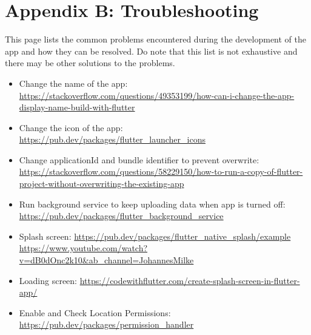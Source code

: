 \documentclass[a4paper]{scrreprt}
\begin{document}
\chapter{Appendix B: Troubleshooting}
This page lists the common problems encountered during the development of the app and how they can be resolved. Do note that this list is not exhaustive and there may be other solutions to the problems.
\begin{itemize}
    \item Change the name of the app:
    \url{https://stackoverflow.com/questions/49353199/how-can-i-change-the-app-display-name-build-with-flutter}
    
    \item Change the icon of the app:
    \url{https://pub.dev/packages/flutter_launcher_icons}
    
    \item Change applicationId and bundle identifier to prevent overwrite:
    \url{https://stackoverflow.com/questions/58229150/how-to-run-a-copy-of-flutter-project-without-overwriting-the-existing-app}
    
    \item Run background service to keep uploading data when app is turned off:
    \url{https://pub.dev/packages/flutter_background_service}
    
    \item Splash screen:
    \url{https://pub.dev/packages/flutter_native_splash/example}
    \url{https://www.youtube.com/watch?v=dB0dOnc2k10&ab_channel=JohannesMilke}
    
    \item Loading screen:
    \url{https://codewithflutter.com/create-splash-screen-in-flutter-app/}
    
    \item Enable and Check Location Permissions:
    \url{https://pub.dev/packages/permission_handler}
    

\end{itemize}
\end{document}

